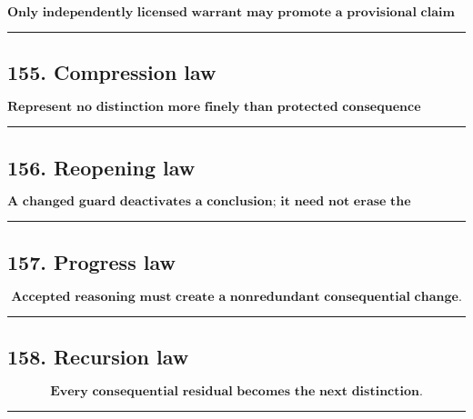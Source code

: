 \documentclass[
]{article}
\begin{document}
\[
\boxed{
\textbf{Only independently licensed warrant may promote a provisional claim into retained hard knowledge.}
}
\]

\begin{center}\rule{0.5\linewidth}{0.5pt}\end{center}

\subsection{155. Compression law}\label{compression-law}

\[
\boxed{
\textbf{Represent no distinction more finely than protected consequence requires,
and no more coarsely than protected consequence permits.}
}
\]

\begin{center}\rule{0.5\linewidth}{0.5pt}\end{center}

\subsection{156. Reopening law}\label{reopening-law}

\[
\boxed{
\textbf{A changed guard deactivates a conclusion; it need not erase the warrant that established it under its original conditions.}
}
\]

\begin{center}\rule{0.5\linewidth}{0.5pt}\end{center}

\subsection{157. Progress law}\label{progress-law}

\[
\boxed{
\textbf{Accepted reasoning must create a nonredundant consequential change.}
}
\]

\begin{center}\rule{0.5\linewidth}{0.5pt}\end{center}

\subsection{158. Recursion law}\label{recursion-law}

\[
\boxed{
\textbf{Every consequential residual becomes the next distinction.}
}
\]

\begin{center}\rule{0.5\linewidth}{0.5pt}\end{center}
\end{document}
